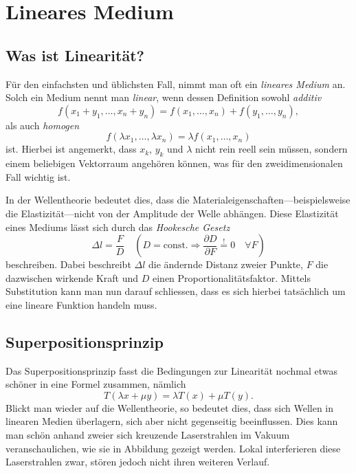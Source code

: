 %
%
%
%
\section{Lineares Medium\label{particles:section:linear}}

\subsection{Was ist Linearität?}
Für den einfachsten und üblichsten Fall, nimmt man oft ein \emph{lineares Medium} an.
Solch ein Medium nennt man \emph{linear}, wenn dessen Definition sowohl \emph{additiv}
\[
    f(x_{1} + y_{1}, \ldots, x_{n} + y_{n}) 
    = 
    f(x_{1}, \ldots, x_{n}) 
    + 
    f(y_{1}, \ldots, y_{n}),
\]
als auch \emph{homogen}
\[
    f(\lambda x_{1}, \ldots, \lambda x_{n}) 
    = 
    \lambda f(x_{1}, \ldots, x_{n})
\]
ist.
Hierbei ist angemerkt, dass $x_{k}$, $y_{k}$ und $\lambda$ nicht rein reell sein müssen, 
sondern einem beliebigen Vektorraum angehören können, 
was für den zweidimensionalen Fall wichtig ist.

In der Wellentheorie bedeutet dies, 
dass die Materialeigenschaften---beispielsweise die Elastizität---nicht von der Amplitude der Welle abhängen.
Diese Elastizität eines Mediums lässt sich durch das \emph{Hookesche Gesetz} 
\[
    \Delta l
    = 
    \frac{F}{D}
    \quad
    (D = \text{const.} 
    \Rightarrow 
    \frac{\partial D}{\partial F} 
    \overset{!}{=} 
    0 
    \quad 
    \forall F)
    \label{particles:eq:hookesches-gesetz}
\]
beschreiben.
Dabei beschreibt $\Delta l$ die ändernde Distanz zweier Punkte,
$F$ die dazwischen wirkende Kraft und $D$ einen Proportionalitätsfaktor.
Mittels Substitution kann man nun darauf schliessen, 
dass es sich hierbei tatsächlich um eine lineare Funktion handeln muss.


\subsection{Superpositionsprinzip}\label{particles:section:lin-medium:superposition}
Das Superpositionsprinzip fasst die Bedingungen zur Linearität nochmal etwas schöner in eine Formel zusammen, 
nämlich
\[
    T(\lambda x + \mu y)
    = 
    \lambda T(x) 
    + 
    \mu T(y).
\]
Blickt man wieder auf die Wellentheorie, so bedeutet dies, 
dass sich Wellen in linearen Medien überlagern, 
sich aber nicht gegenseitig beeinflussen.
Dies kann man schön anhand zweier sich kreuzende Laserstrahlen im Vakuum veranschaulichen, 
wie sie in Abbildung  gezeigt werden.
Lokal interferieren diese Laserstrahlen zwar, stören jedoch nicht ihren weiteren Verlauf. 

